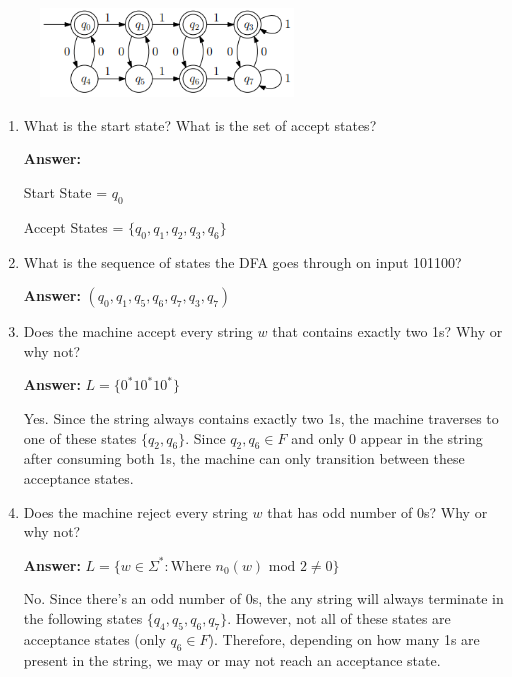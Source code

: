 \documentclass[12pt]{article}
\begin{document}
\begin{enumerate}
	      \begin{figure}[h!]
		      \centering
		      \includegraphics[width=0.6\textwidth]{img/q2/q2_automata.png}
	      \end{figure}

	      \begin{enumerate}
		      \item What is the start state? What is the set of accept states?

		            \noindent \textbf{Answer:}

		            Start State = $q_0$

		            Accept States = $\{q_0, q_1, q_2, q_3, q_6\}$

		      \item What is the sequence of states the DFA goes through on input 101100?

		            \noindent \textbf{Answer:} $(q_0, q_1, q_5, q_6, q_7, q_3, q_7)$

		      \item Does the machine accept every string $w$ that contains exactly two 1s? Why or why not?

		            \noindent \textbf{Answer:} $L = \{0^*10^*10^* \}$

		            Yes. Since the string always contains exactly two 1s, the machine traverses to one of these states $\{q_2, q_6 \}$. Since $q_2, q_6 \in F$ and only 0 appear in the string after consuming both 1s, the machine can only transition between these acceptance states.

		      \item Does the machine reject every string $w$ that has odd number of 0s? Why or why not?

		            \noindent \textbf{Answer:} $L = \{w \in \Sigma^* : \text{Where $n_0(w)$ mod $2 \neq 0$} \}$

		            No. Since there's an odd number of 0s, the any string will always terminate in the following states $\{q_4, q_5, q_6, q_7 \}$. However, not all of these states are acceptance states (only $q_6 \in F$). Therefore, depending on how many 1s are present in the string, we may or may not reach an acceptance state.


\end{enumerate}
\end{enumerate}
\end{document}
